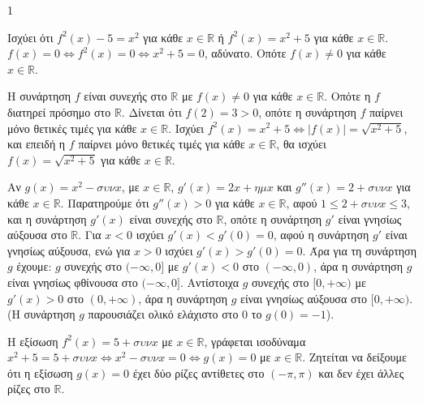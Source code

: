 \begin{ylh}{1}
    \item [Ύλη από εικόνα]
\end{ylh}
\begin{alist}
\item [Α)]
\begin{rlist}
\item Ισχύει ότι $f^2(x) - 5 = x^2$ για κάθε $x \in \mathbb{R}$ ή $f^2(x) = x^2+5$ για κάθε $x \in \mathbb{R}$.
    $f(x) = 0 \Leftrightarrow f^2(x) = 0 \Leftrightarrow x^2+5=0$, αδύνατο. Οπότε $f(x) \ne 0$ για κάθε $x \in \mathbb{R}$.
\item Η συνάρτηση $f$ είναι συνεχής στο $\mathbb{R}$ με $f(x) \ne 0$ για κάθε $x \in \mathbb{R}$. Οπότε η $f$ διατηρεί πρόσημο στο $\mathbb{R}$. Δίνεται ότι $f(2)=3>0$, οπότε η συνάρτηση $f$ παίρνει μόνο θετικές τιμές για κάθε $x \in \mathbb{R}$. Ισχύει $f^2(x)=x^2+5 \Leftrightarrow |f(x)|=\sqrt{x^2+5}$, και επειδή η $f$ παίρνει μόνο θετικές τιμές για κάθε $x \in \mathbb{R}$, θα ισχύει $f(x)=\sqrt{x^2+5}$ για κάθε $x \in \mathbb{R}$.
\end{rlist}
\item [Β)]
\begin{rlist}
\item Αν $g(x)=x^2-\sigma\upsilon\nu x$, με $x \in \mathbb{R}$, $g'(x)=2x+\eta\mu x$ και $g''(x)=2+\sigma\upsilon\nu x$ για κάθε $x \in \mathbb{R}$.
    Παρατηρούμε ότι $g''(x)>0$ για κάθε $x \in \mathbb{R}$, αφού $1 \le 2+\sigma\upsilon\nu x \le 3$, και η συνάρτηση $g'(x)$ είναι συνεχής στο $\mathbb{R}$, οπότε η συνάρτηση $g'$ είναι γνησίως αύξουσα στο $\mathbb{R}$.
    Για $x < 0$ ισχύει $g'(x) < g'(0) = 0$, αφού η συνάρτηση $g'$ είναι γνησίως αύξουσα, ενώ για $x>0$ ισχύει $g'(x) > g'(0) = 0$. Άρα για τη συνάρτηση $g$ έχουμε:
    $g$ συνεχής στο $(-\infty, 0]$ με $g'(x) < 0$ στο $(-\infty, 0)$, άρα η συνάρτηση $g$ είναι γνησίως φθίνουσα στο $(-\infty, 0]$. Αντίστοιχα
    $g$ συνεχής στο $[0, +\infty)$ με $g'(x) > 0$ στο $(0, +\infty)$, άρα η συνάρτηση $g$ είναι γνησίως αύξουσα στο $[0, +\infty)$.
    (Η συνάρτηση $g$ παρουσιάζει ολικό ελάχιστο στο $0$ το $g(0)=-1$).
\item Η εξίσωση $f^2(x)=5+\sigma\upsilon\nu x$ με $x \in \mathbb{R}$, γράφεται ισοδύναμα $x^2+5=5+\sigma\upsilon\nu x \Leftrightarrow x^2-\sigma\upsilon\nu x=0 \Leftrightarrow g(x)=0$ με $x \in \mathbb{R}$. Ζητείται να δείξουμε ότι η εξίσωση $g(x)=0$ έχει δύο ρίζες αντίθετες στο $(-\pi, \pi)$ και δεν έχει άλλες ρίζες στο $\mathbb{R}$.


\end{rlist}
\end{alist}

